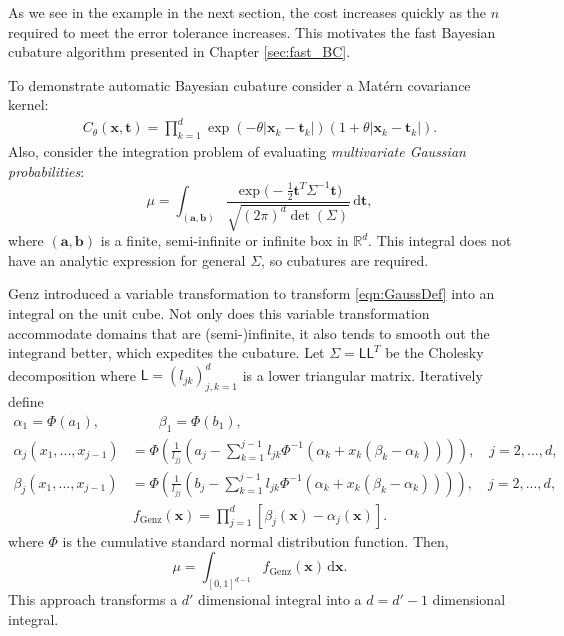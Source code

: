 \documentclass{iitthesis}          %
\newcommand{\bm}[1]{\boldsymbol{#1}}
\newcommand{\mSigma}{\mathsf{\Sigma}}
\newcommand{\dif}[1]{\text{d}{#1}}
\newcommand{\reals}{\mathbb{R}}
\newcommand{\va}{\bm{a}}
\newcommand{\vb}{\bm{b}}
\newcommand{\vt}{\bm{t}}
\newcommand{\vx}{\bm{x}}
\newcommand{\dvx}{\dif{\bm{x}}}
\newcommand{\dvt}{\dif{\bm{t}}}
\newcommand{\mL}{\mathsf{L}}
\begin{document}
As we see in the example in the next section, the cost increases quickly as the $n$ required to meet the error tolerance increases.  This motivates the fast Bayesian cubature algorithm presented in Chapter \ref{sec:fast_BC}.


 \label{MVN_example}

To demonstrate automatic Bayesian cubature consider a Mat\'ern covariance kernel:
\begin{align*}
C_{\theta}(\vx, \vt) = \prod_{k=1}^d \exp(-\theta|\vx_k-\vt_k|)(1+\theta |\vx_k-\vt_k|).
\end{align*}
Also, consider the integration problem of evaluating  \emph{multivariate Gaussian probabilities}:
\begin{equation}
\label{eqn:GaussDef}
\mu = \int_{(\va,\vb)} \frac{\exp\bigl(- \frac 12 \vt^T \mSigma^{-1} \vt \bigr)}{\sqrt{(2 \pi)^d \det(\mSigma)}} \, \dvt,
\end{equation}
where $(\va,\vb)$ is a finite, semi-infinite or infinite box in $\reals^d$.  This integral does not have an analytic expression for general $\mSigma$, so cubatures are required.  

Genz \cite{Gen93} introduced a variable transformation to transform \eqref{eqn:GaussDef} into an integral on the unit cube.  Not only does this variable transformation accommodate domains that are (semi-)infinite, it also tends to smooth out the integrand better, which expedites the cubature.  Let $\mSigma= \mL \mL^T$ be the Cholesky decomposition where $\mL = (l_{jk})_{j,k=1}^d$ is a lower triangular matrix.  Iteratively define
\begin{align*}
\alpha_1 = \Phi(a_1), 
&\qquad
\beta_1 = \Phi(b_1),
\\
\alpha_j(x_1,...,x_{j-1}) &= 
\Phi
\left(
\frac{1}{l_{jj}} 
\left(
a_j - \sum_{k=1}^{j-1} l_{jk} \Phi^{-1}(\alpha_k + x_k(\beta_k-\alpha_k))
\right)
\right), \quad j=2,...,d,
\\
\beta_j(x_1,...,x_{j-1}) &= 
\Phi
\left(
\frac{1}{l_{jj}} 
\left(
b_j - \sum_{k=1}^{j-1} l_{jk} \Phi^{-1}(\alpha_k + x_k(\beta_k-\alpha_k))
\right)
\right), \quad j=2,...,d,
\end{align*}
\begin{align}
\label{eqn:fGenzdef}
f_{\text{Genz}}(\vx) = \prod_{j=1}^d [\beta_j(\vx) - \alpha_j(\vx)].
\end{align}
where $\Phi$ is the cumulative standard normal distribution function.
Then, $$\mu = \int_{[0,1]^{d-1}} f_{\text{Genz}}(\vx) \, \dvx.$$
This approach transforms a $d'$ dimensional integral into a $d=d'-1$ dimensional integral.
\end{document}

